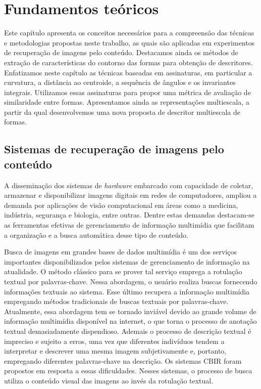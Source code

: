 
\chapter{Fundamentos teóricos\label{chap:FUNDA}}

Este capítulo apresenta os conceitos necessários para a compreensão das técnicas e metodologias propostas neste trabalho, as quais são aplicadas em experimentos de recuperação de imagens pelo conteúdo. Destacamos ainda os métodos de extração de características do contorno das formas para obtenção de descritores. Enfatizamos neste capítulo as técnicas baseadas em assinaturas, em particular a curvatura, a distância ao centroide, a sequência de ângulos e os invariantes integrais. Utilizamos essas assinaturas para propor uma métrica de avaliação de similaridade entre formas. Apresentamos ainda as representações multiescala, a partir da qual desenvolvemos uma nova proposta de descritor multiescala de formas.


\section{\label{chap:CBIR} Sistemas de recuperação de imagens pelo conteúdo}

A disseminação dos sistemas de \textit{hardware} embarcado com capacidade de coletar, armazenar e disponibilizar imagens digitais em redes de computadores, ampliou a demanda por aplicações de visão computacional em áreas como a medicina, indústria, segurança e biologia, entre outras. Dentre estas  demandas destacam-se as ferramentas efetivas de gerenciamento de informação multimídia que facilitam a organização e a busca automática desse tipo de conteúdo. 

Busca de imagens em grandes bases de dados multimídia é um dos serviços importantes disponibilizados pelos sistemas de gerenciamento de informação na atualidade. O método clássico para se prover tal serviço emprega a rotulação textual por palavras-chave. Nessa abordagem, o usuário realiza buscas fornecendo informações textuais ao sistema. Esse último recupera a informação multimídia empregando métodos tradicionais de buscas textuais por palavras-chave. Atualmente, essa abordagem tem se tornado inviável devido ao grande volume de informação multimídia disponível na internet, o que torna o processo de anotação textual demasiadamente dispendioso. Ademais o processo de descrição textual é impreciso e sujeito a erros, uma vez que diferentes indivíduos tendem a interpretar e descrever uma mesma imagem subjetivamente e, portanto, empregando diferentes palavras-chave na descrição. Os sistemas  \ac{CBIR} foram propostos em resposta a essas dificuldades. Nesses sistemas, o processo de busca utiliza o conteúdo visual das imagens ao invés da rotulação textual. 

